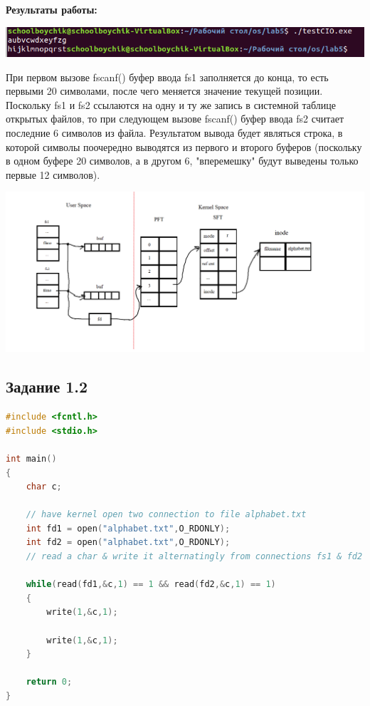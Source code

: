 \textbf{Результаты работы:}

\includegraphics[scale=1]{img/Screenshot_1.png}

При первом вызове fscanf() буфер ввода fs1 заполняется до конца, то есть первыми 20 символами, после чего меняется значение текущей позиции. Поскольку fs1 и fs2 ссылаются на одну и ту же запись в системной таблице открытых файлов, то при следующем вызове fscanf() буфер ввода fs2 считает последние 6 символов из файла. Результатом вывода будет являться строка, в которой символы поочередно выводятся из первого и второго буферов (поскольку в одном буфере 20 символов, а в другом 6, "вперемешку" будут выведены только первые 12 символов).

\includegraphics[scale=0.5]{img/1.png}
\newpage
\subsection*{Задание 1.2}

\begin{lstlisting}[language=c,label=some-code2,caption=Программа 2]
#include <fcntl.h>
#include <stdio.h>

int main()
{
	char c;  
	  
	// have kernel open two connection to file alphabet.txt
	int fd1 = open("alphabet.txt",O_RDONLY);
	int fd2 = open("alphabet.txt",O_RDONLY);
	// read a char & write it alternatingly from connections fs1 & fd2

	while(read(fd1,&c,1) == 1 && read(fd2,&c,1) == 1)
	{
		write(1,&c,1);

		write(1,&c,1);
	}

	return 0;
}

\end{lstlisting} 

